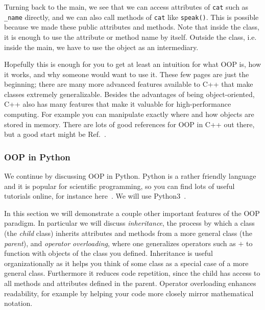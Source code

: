 Turning back to the main, we see that we can access attributes of
\texttt{cat} such as \texttt{\_name} directly, and we can also call
methods of \texttt{cat} like \texttt{speak()}. This is possible because
we made these public attributes and methods. Note that inside the class,
it is enough to use the attribute or method name by itself. Outside the
class, i.e. inside the main, we have to use the object as an 
intermediary.

Hopefully this is enough for you to get at least an intuition for
what OOP is, how it works, and why someone would want to use it. These
few pages are just the beginning; there are many more advanced
features available to C++ that make classes extremely generalizable.
Besides the advantages of being object-oriented, C++ also has many
features that make it valuable for high-performance computing.
For example you can manipulate exactly where and how objects
are stored in memory. There are lots of good references for OOP
in C++ out there, but a good start might be Ref.~\cite{tp:cpp}.\\




\subsubsection{OOP in Python}

We continue by discussing OOP in Python. Python is a rather friendly language
and it is popular for scientific programming, so you can find lots of useful
tutorials online, for instance here~\cite{pythonOOP}. We will use
Python3~\cite{python3}.

In this section we will demonstrate
a couple other important features of the OOP paradigm. In particular we will
discuss {\it inheritance}, the process by which a
class (the {\it child} class) inherits attributes and methods
from a more general class (the {\it parent}), and
{\it operator overloading},  where one generalizes 
operators such as $+$ to function with objects of the class you defined.
Inheritance is useful organizationally as it helps you think of some class
as a special case of a more general class. Furthermore it reduces code
repetition, since the child has access to all methods and attributes defined in
the parent. Operator overloading enhances readability, for example by
helping your code more closely mirror mathematical notation.\\

